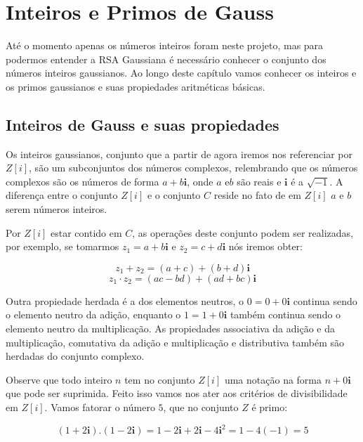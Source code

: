 \chapter {Inteiros e Primos de Gauss}
\label{IG}

\hspace{7mm}At\'e o momento apenas os n\'umeros inteiros foram neste projeto, mas para podermos entender a RSA Gaussiana \'e necess\'ario conhecer o conjunto dos n\'umeros inteiros gaussianos. Ao longo deste cap\'itulo vamos conhecer os inteiros e os primos gaussianos e suas propiedades aritm\'eticas b\'asicas. 

\section{Inteiros de Gauss e suas propiedades}

\hspace{7mm}Os inteiros gaussianos, conjunto que a partir de agora iremos nos referenciar por $Z[i]$, s\~ao um subconjuntos dos n\'umeros complexos, relembrando que os n\'umeros complexos s\~ao os n\'umeros de forma $a+b\textbf{i}$, onde $a$ e$b$ s\~ao reais e $\textbf{i}$ \'e a $\sqrt{-1}$. A diferen\c{c}a entre o conjunto $Z[i]$ e o conjunto $C$ reside no fato de em $Z[i]$ $a$ e $b$ serem n\'umeros inteiros.

Por $Z[i]$ estar contido em $C$, as opera\c{c}\~oes deste conjunto podem ser realizadas, por exemplo, se tomarmos $z_1= a + b\textbf{i}$ e $z_2= c + d\textbf{i}$ n\'os iremos obter:

$$z_1   +   z_2 = (a + c) + (b + d)\textbf{i}$$
$$z_1 \cdot z_2 = (ac - bd) + (ad + bc)\textbf{i}$$

Outra propiedade herdada \'e a dos elementos neutros, o $0 = 0 + 0\textbf{i}$ continua sendo o elemento neutro da adi\c{c}\~ao, enquanto o $1 = 1 + 0\textbf{i}$ tamb\'em continua sendo o elemento neutro da multiplica\c{c}\~ao. As propiedades associativa da adi\c{c}\~ao e da multiplica\c{c}\~ao, comutativa da adi\c{c}\~ao e multiplica\c{c}\~ao e distributiva tamb\'em s\~ao herdadas do conjunto complexo.

Observe que todo inteiro $n$ tem no conjunto $Z[i]$ uma nota\c{c}\~ao na forma $n + 0 \textbf{i}$ que pode ser suprimida. Feito isso vamos nos ater aos crit\'erios de divisibilidade em $Z[i]$. Vamos fatorar o n\'umero $5$, que no conjunto $Z$ \'e primo:

$$(1 + 2\textbf{i}).(1 - 2\textbf{i}) = 1 - 2\textbf{i} + 2\textbf{i} - 4\textbf{i}^2 = 1 - 4(-1) = 5$$

